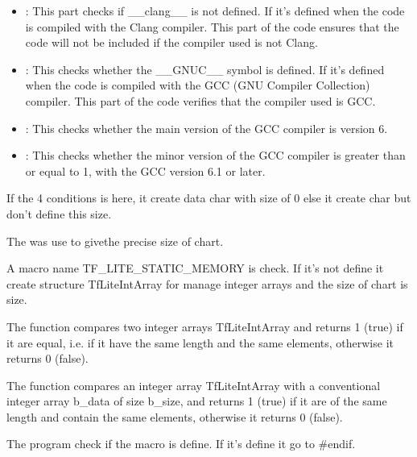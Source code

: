 \begin{itemize}
    \item {}: This part checks if \_\_clang\_\_ is not defined. If it's defined when the code is compiled with the Clang compiler.  This part of the code ensures that the code will not be included if the compiler used is not Clang.
    
    \item {}: This checks whether the \_\_GNUC\_\_ symbol is defined. If it's defined when the code is compiled with the GCC (GNU Compiler Collection) compiler. This part of the code verifies that the compiler used is GCC.
    
    \item {} : This checks whether the main version of the GCC compiler is version 6.
    
    \item {}: This checks whether the minor version of the GCC compiler is greater than or equal to 1, with the GCC version 6.1 or later.
\end{itemize}

If the 4 conditions is here, it create data char with  size of 0 else it create char but don't define this size. 

\begin{center}
    \label{Figure:Comatibily}
\end{center}
The  was use to givethe precise size of chart.  

A macro name TF\_LITE\_STATIC\_MEMORY is check. If it's not define it create structure TfLiteIntArray for manage integer arrays and the size of chart is size. 

The function  compares two integer arrays TfLiteIntArray and returns 1 (true) if it are equal, i.e. if it have the same length and the same elements, otherwise it returns 0 (false).


The function  compares an integer array TfLiteIntArray with a conventional integer array b\_data of size b\_size, and returns 1 (true) if it are of the same length and contain the same elements, otherwise it returns 0 (false).


The program check if the macro  is define. If it's define it go to \#endif. 

